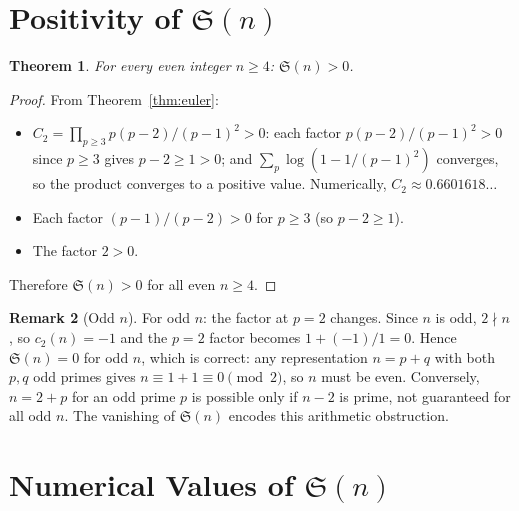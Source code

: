 \documentclass[12pt,a4paper]{amsart}
\newtheorem{theorem}{Theorem}[section]
\theoremstyle{definition}
\newtheorem{remark}[theorem]{Remark}
\begin{document}
\section{Positivity of \texorpdfstring{$\mathfrak{S}(n)$}{S(n)}}
\label{sec:positivity}

\begin{theorem}\label{thm:pos}
  For every even integer $n \geq 4$: $\mathfrak{S}(n) > 0$.
\end{theorem}

\begin{proof}
  From Theorem~\ref{thm:euler}:
  \begin{itemize}
    \item $C_2 = \prod_{p \geq 3} p(p-2)/(p-1)^2 > 0$:
      each factor $p(p-2)/(p-1)^2 > 0$ since $p \geq 3$ gives $p-2 \geq 1 > 0$;
      and $\sum_p \log(1 - 1/(p-1)^2)$ converges, so the product converges
      to a positive value.  Numerically, $C_2 \approx 0.6601618\ldots$
    \item Each factor $(p-1)/(p-2) > 0$ for $p \geq 3$ (so $p-2 \geq 1$).
    \item The factor $2 > 0$.
  \end{itemize}
  Therefore $\mathfrak{S}(n) > 0$ for all even $n \geq 4$.
\end{proof}

\begin{remark}[Odd $n$]
  For odd $n$: the factor at $p = 2$ changes.  Since $n$ is odd,
  $2 \nmid n$, so $c_2(n) = -1$ and the $p=2$ factor becomes
  $1 + (-1)/1 = 0$.  Hence $\mathfrak{S}(n) = 0$ for odd $n$,
  which is correct: any representation $n = p + q$ with both $p, q$ odd primes
  gives $n \equiv 1 + 1 \equiv 0 \pmod{2}$, so $n$ must be even.
  Conversely, $n = 2 + p$ for an odd prime $p$ is possible only if $n - 2$ is prime,
  not guaranteed for all odd $n$.  The vanishing of $\mathfrak{S}(n)$ encodes
  this arithmetic obstruction.
\end{remark}

\section{Numerical Values of \texorpdfstring{$\mathfrak{S}(n)$}{S(n)}}
\label{sec:numerical}
\end{document}
